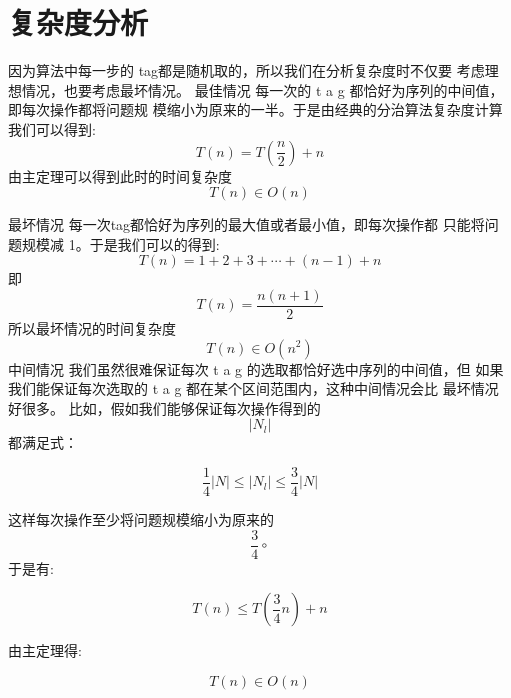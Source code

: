 \section{复杂度分析}
因为算法中每一步的 tag都是随机取的，所以我们在分析复杂度时不仅要 考虑理想情况，也要考虑最坏情况。
最佳情况  \quad  每一次的  t a g  都恰好为序列的中间值，即每次操作都将问题规 模缩小为原来的一半。于是由经典的分治算法复杂度计算我们可以得到:
$$T(n)=T\left(\frac{n}{2}\right)+n$$
由主定理可以得到此时的时间复杂度
$$T(n) \in O(n)$$

最坏情况 每一次tag都恰好为序列的最大值或者最小值，即每次操作都 只能将问题规模减 1。于是我们可以的得到:
$$
T(n)=1+2+3+\cdots+(n-1)+n
$$
即
$$
T(n)=\frac{n(n+1)}{2}
$$
所以最坏情况的时间复杂度
$$
T(n) \in O\left(n^{2}\right)
$$
中间情况  \quad  我们虽然很难保证每次  t a g  的选取都恰好选中序列的中间值，但
如果我们能保证每次选取的  t a g  都在某个区间范围内，这种中间情况会比 最坏情况好很多。
比如，假如我们能够保证每次操作得到的  
$$\left|N_{l}\right|  $$
都满足式：

$$\frac{1}{4}|N| \leq\left|N_{l}\right| \leq \frac{3}{4}|N|$$

这样每次操作至少将问题规模缩小为原来的  $$\frac{3}{4} \circ $$ 于是有:

$$T(n) \leq T\left(\frac{3}{4} n\right)+n$$

由主定理得:

$$T(n) \in O(n)$$

